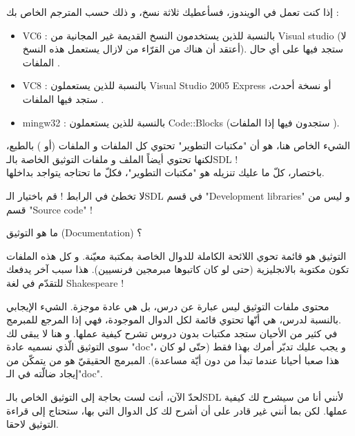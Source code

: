 إذا كنت تعمل في الويندوز، فسأعطيك ثلاثة نسخ، و ذلك حسب المترجم الخاص بك :

\begin{itemize}
	\item \textenglish{VC6} :
	بالنسبة للذين يستخدمون النسخ القديمة غير المجانية من
	\textenglish{Visual studio}
	(لا أعتقد أن هناك من القرّاء من لازال يستعمل هذه النسخ). ستجد فيها على أي حال الملفات
	.
	\item \textenglish{VC8} :
	 بالنسبة للذين يستعملون 
	\textenglish{Visual Studio 2005 Express}
	أو نسخة أحدث، ستجد فيها الملفات
	.
	\item \textenglish{mingw32} :
	بالنسبة للذين يستعملون 
	\textenglish{Code::Blocks}
	(ستجدون فيها إذا الملفات
	).
\end{itemize}

الشيء الخاص هنا، هو أن "مكتبات التطوير" تحتوي كل الملفات
و الملفات
(أو
)
بالطبع، لكنها تحتوي أيضاً الملف 
و ملفات التوثيق الخاصة بالـ\textenglish{SDL} !\\
باختصار، كلّ ما عليك تنزيله هو "مكتبات التطوير"، فكلّ ما تحتاجه يتواجد بداخلها.

\begin{critical}
لا تخطئ في الرابط ! قم باختيار الـ\textenglish{SDL}
في قسم
"\textenglish{Development libraries}"
و ليس من قسم
"\textenglish{Source code}" !
\end{critical}

\begin{question}
ما هو التوثيق 
(\textenglish{Documentation}) ؟
\end{question}

التوثيق هو قائمة تحوي اللائحة الكاملة للدوال الخاصة بمكتبة معيّنة. و كل هذه الملفات تكون مكتوبة بالانجليزية (حتى لو كان كاتبوها مبرمجين فرنسيين). هذا سبب آخر يدفعك للتقدّم في لغة
\textenglish{Shakespeare} !

محتوى ملفات التوثيق  ليس عبارة عن درس، بل هي عادة موجزة. الشيء الإيجابي بالنسبة لدرس، هي أنّها تحتوي قائمة لكل الدوال الموجودة،  فهي إذا المرجع للمبرمج.\\
في كثير من الأحيان ستجد مكتبات بدون دروس تشرح كيفية عملها. و هنا لا يبقى لك سوى التوثيق الّذي نسميه عادة
"\textenglish{doc}"،
و يجب عليك تدبّر أمرك بهذا فقط (حتّى لو كان هذا صعبا أحيانا عندما تبدأ من دون أيّة مساعدة). المبرمج الحقيقيّ هو من يتمكّن من إيجاد ضالّته في الـ"\textenglish{doc}".

لحدّ الآن، أنت لست بحاجة إلى التوثيق الخاص بالـ\textenglish{SDL}
لأنني أنا من سيشرح لك كيفية عملها. لكن بما أنني غير قادر على أن أشرح لك كل الدوال التي بها، ستحتاج إلى قراءة التوثيق لاحقا. 

